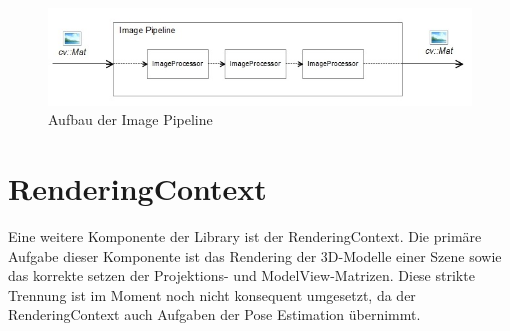 \begin{figure}[!ht]
\centering
\includegraphics[scale=0.8]{images/image-pipeline.jpg} 
\caption{Aufbau der Image Pipeline}
\label{fig:image-pipeline}
\end{figure}

\section{RenderingContext}
Eine weitere Komponente der Library ist der RenderingContext. Die primäre Aufgabe dieser Komponente ist das Rendering der 3D-Modelle einer Szene sowie das korrekte setzen der Projektions- und ModelView-Matrizen. Diese strikte Trennung ist im Moment noch nicht konsequent umgesetzt, da der RenderingContext auch Aufgaben der Pose Estimation übernimmt.  
